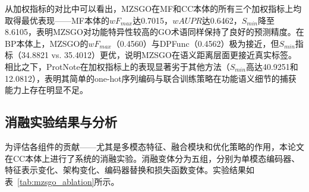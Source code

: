 从加权指标的对比中可以看出，MZSGO在MF和CC本体的所有三个加权指标上均取得最优表现——MF本体的$wF_{max}$达0.7015，$wAUPR$达0.6462，$S_{min}$降至8.6105，表明MZSGO对功能特异性较高的GO术语同样保持了良好的预测精度。在BP本体上，MZSGO的$wF_{max}$（0.4560）与DPFunc（0.4562）极为接近，但$S_{min}$指标（34.8821 vs. 35.4012）更优，说明MZSGO在语义距离层面更接近真实标签。相比之下，ProtNote在加权指标上的表现显著劣于其他方法（$S_{min}$高达40.9251和12.0812），表明其简单的one-hot序列编码与联合训练策略在功能语义细节的捕获能力上存在明显不足。

\subsection{消融实验结果与分析}

为评估各组件的贡献——尤其是多模态特征、融合模块和优化策略的作用，本论文在CC本体上进行了系统的消融实验。消融变体分为五组，分别为单模态编码器、特征表示变化、架构变化、编码器替换和损失函数变体。实验结果如表~\ref{tab:mzsgo_ablation}所示。

